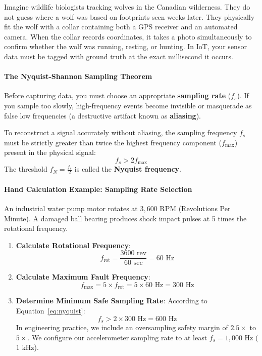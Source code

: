 \begin{analogy}
Imagine wildlife biologists tracking wolves in the Canadian wilderness. They do not guess where a wolf was based on footprints seen weeks later. They physically fit the wolf with a collar containing both a GPS receiver and an automated camera. When the collar records coordinates, it takes a photo simultaneously to confirm whether the wolf was running, resting, or hunting. In IoT, your sensor data must be tagged with ground truth at the exact millisecond it occurs.
\end{analogy}

\paragraph{The Nyquist-Shannon Sampling Theorem}
Before capturing data, you must choose an appropriate \textbf{sampling rate} ($f_s$). If you sample too slowly, high-frequency events become invisible or masquerade as false low frequencies (a destructive artifact known as \textbf{aliasing}).
\begin{keyidea}
To reconstruct a signal accurately without aliasing, the sampling frequency $f_s$ must be strictly greater than twice the highest frequency component ($f_{\max}$) present in the physical signal:
\begin{equation}
f_s > 2 f_{\max}\label{eq:nyquist}
\end{equation}
The threshold $f_N = \frac{f_s}{2}$ is called the \textbf{Nyquist frequency}.
\end{keyidea}

\paragraph{Hand Calculation Example: Sampling Rate Selection}
An industrial water pump motor rotates at $3{,}600\text{ RPM}$ (Revolutions Per Minute). A damaged ball bearing produces shock impact pulses at 5 times the rotational frequency.
\begin{enumerate}
    \item \textbf{Calculate Rotational Frequency}:
    \begin{equation*}
    f_{\text{rot}} = \frac{3600\text{ rev}}{60\text{ sec}} = 60\text{ Hz}
    \end{equation*}
    \item \textbf{Calculate Maximum Fault Frequency}:
    \begin{equation*}
    f_{\max} = 5 \times f_{\text{rot}} = 5 \times 60\text{ Hz} = 300\text{ Hz}
    \end{equation*}
    \item \textbf{Determine Minimum Safe Sampling Rate}:
    According to Equation~\ref{eq:nyquist}:
    \begin{equation*}
    f_s > 2 \times 300\text{ Hz} = 600\text{ Hz}
    \end{equation*}
    In engineering practice, we include an oversampling safety margin of $2.5\times$ to $5\times$. We configure our accelerometer sampling rate to at least $f_s = 1{,}000\text{ Hz}$ ($1\text{ kHz}$).
\end{enumerate}

